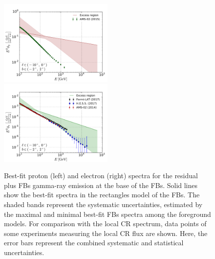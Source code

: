 \begin{figure}[h]
\includegraphics[width=0.5\textwidth]{plots/Summary_proton_spectra_0.pdf}
\includegraphics[width=0.5\textwidth]{plots/Summary_electron_spectra_0.pdf}
  	\caption{
	Best-fit proton (left) and electron (right) spectra for the residual plus FBs gamma-ray emission at the base of the FBs.
	Solid lines show the best-fit spectra in the rectangles model of the FBs.
	The shaded bands represent the systematic uncertainties, 
	estimated by the maximal and minimal best-fit FBs spectra among the foreground models. 
	For comparison with the local CR spectrum, data points of some experiments measuring the local CR flux are shown. 
	Here, the error bars represent the combined systematic and statistical uncertainties.}
  	\label{fig:Particle_spectra}
\end{figure}

